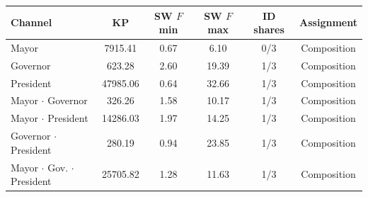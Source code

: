 \begin{tabular}{@{}lccccc@{}}
\toprule
Channel & KP & SW $F$ min & SW $F$ max & ID shares & Assignment \\
\midrule
Mayor & 7915.41 & 0.67 & 6.10 & 0/3 & Composition \\
Governor & 623.28 & 2.60 & 19.39 & 1/3 & Composition \\
President & 47985.06 & 0.64 & 32.66 & 1/3 & Composition \\
Mayor $\cdot$ Governor & 326.26 & 1.58 & 10.17 & 1/3 & Composition \\
Mayor $\cdot$ President & 14286.03 & 1.97 & 14.25 & 1/3 & Composition \\
Governor $\cdot$ President & 280.19 & 0.94 & 23.85 & 1/3 & Composition \\
Mayor $\cdot$ Gov. $\cdot$ President & 25705.82 & 1.28 & 11.63 & 1/3 & Composition \\
\bottomrule
\end{tabular}
